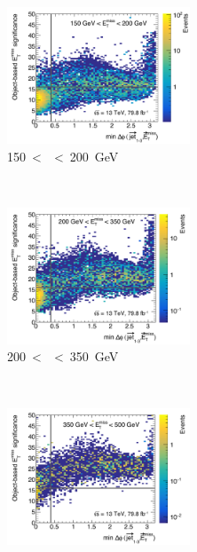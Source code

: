 \begin{figure}[htbp]
  \centering
  \begin{subfigure}{1.\textwidth}
    \centering
    \includegraphics[width=0.6\textwidth]{figures/monoH/multijet/monoHmultijet_correlation150200.pdf}
    \caption{\SI{150} < \met < \SI{200}{\giga\electronvolt}}
  \end{subfigure}
  \\
  \begin{subfigure}{1.\textwidth}
    \centering
    \includegraphics[width=0.6\textwidth]{figures/monoH/multijet/monoHmultijet_correlation200350.pdf}
    \caption{\SI{200} < \met < \SI{350}{\giga\electronvolt}}
  \end{subfigure}
  \\
  \begin{subfigure}{1.\textwidth}
    \centering
    \includegraphics[width=0.6\textwidth]{figures/monoH/multijet/monoHmultijet_correlation350500.pdf}

\end{subfigure}
\end{figure}
